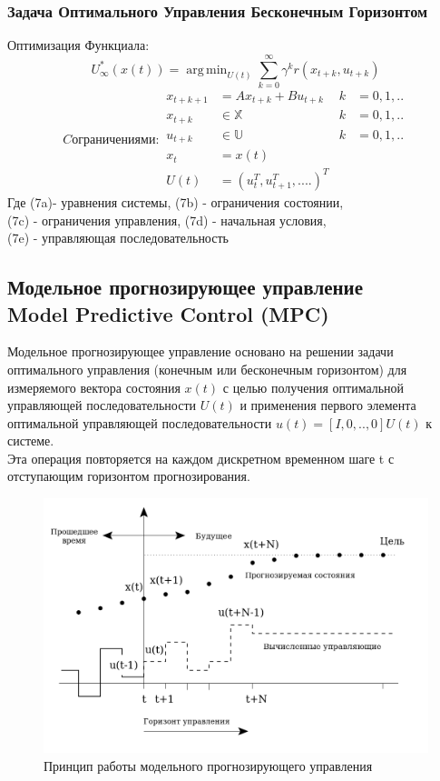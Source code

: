 \documentclass[a4paper,12pt]{article}
\DeclareMathOperator*{\argmin}{arg\,min}
\DeclareMathOperator*{\argmin}{arg\,min}
\begin{document}
\subsubsection{Задача Оптимального Управления Бесконечным Горизонтом}
Оптимизация Функциала:
\begin{equation}
    U_\infty^*(x(t))=\argmin_{U(t)} \sum_{k=0}^{\infty} \gamma^k r(x_{t+k},u_{t+k})
\end{equation}
\begin{subequations}
C ограничениями:
\begin{align}
    x_{t+k+1} & = Ax_{t+k}+Bu_{t+k}  & k&=0,1,.. \\
    x_{t+k} & \in \mathbb{X}  & k&=0,1,.. \\
    u_{t+k} & \in \mathbb{U}  & k&=0,1,.. \\
    x_t&=x(t) \\
    U(t)&=(u_t^T, u_{t+1}^T, ....)^T
\end{align}
\end{subequations}
Где (7a)- уравнения системы, (7b) - ограничения состоянии, \\ 
\null \qquad (7c) - ограничения управления, (7d) - начальная условия, \\ 
\null \qquad (7e) - управляющая последовательность
\newpage
\subsection{Модельное прогнозирующее управление\\
Model Predictive Control (MPC)}
Модельное прогнозирующее управление основано на решении задачи оптимального управления (конечным или бесконечным горизонтом) для измеряемого вектора состояния $x (t)$ с целью получения оптимальной управляющей последовательности $U(t)$ и применения первого элемента оптимальной управляющей последовательности $u(t)=[I,0,..,0] U(t)$ к системе.\\
Эта операция повторяется на каждом дискретном временном шаге t с отступающим горизонтом прогнозирования.\\
\begin{figure}[H]
    \centering
    \includegraphics[width=\textwidth]{img/mpc_diag(1).png}
    \caption{Принцип работы модельного прогнозирующего управления}
    \label{fig:my_label}
\end{figure}
\end{document}

